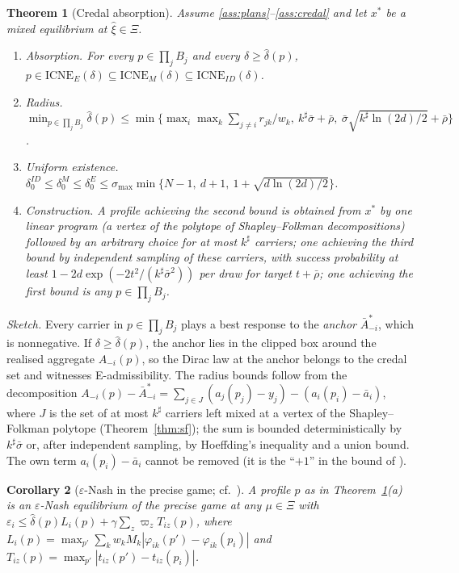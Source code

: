 \documentclass[preprint,12pt]{elsarticle}
\newtheorem{theorem}{Theorem}
\newtheorem{corollary}[theorem]{Corollary}
\theoremstyle{definition}
\theoremstyle{remark}
\newcommand{\abar}{\bar a}
\newcommand{\Abar}{\bar A}
\newcommand{\ICNE}{\mathrm{ICNE}}
\begin{document}
\begin{theorem}[Credal absorption]\label{thm:main}
Assume \ref{ass:plans}--\ref{ass:credal} and let $x^*$ be a mixed equilibrium at $\hat\xi\in\Xi$.
\begin{enumerate}[label=(\alph*),leftmargin=*]
\item \emph{Absorption.} For every $p\in\prod_jB_j$ and every $\delta\ge\hat\delta(p)$, $p\in\ICNE_E(\delta)\subseteq\ICNE_M(\delta)\subseteq\ICNE_{ID}(\delta)$.
\item \emph{Radius.} $\min_{p\in\prod_jB_j}\hat\delta(p)\le\min\big\{\max_i\max_k\sum_{j\ne i}r_{jk}/w_k,\ k^\sharp\bar\sigma+\bar\rho,\ \bar\sigma\sqrt{k^\sharp\ln(2d)/2}+\bar\rho\big\}$.
\item \emph{Uniform existence.} $\delta_0^{ID}\le\delta_0^M\le\delta_0^E\le\sigma_{\max}\min\{N-1,\ d+1,\ 1+\sqrt{d\ln(2d)/2}\}$.
\item \emph{Construction.} A profile achieving the second bound is obtained from $x^*$ by one linear program (a vertex of the polytope of Shapley--Folkman decompositions) followed by an arbitrary choice for at most $k^\sharp$ carriers; one achieving the third bound by independent sampling of these carriers, with success probability at least $1-2d\exp(-2t^2/(k^\sharp\bar\sigma^2))$ per draw for target $t+\bar\rho$; one achieving the first bound is any $p\in\prod_jB_j$.
\end{enumerate}
\end{theorem}

\emph{Sketch.} Every carrier in $p\in\prod_jB_j$ plays a best response to the \emph{anchor} $\Abar^*_{-i}$, which is nonnegative. If $\delta\ge\hat\delta(p)$, the anchor lies in the clipped box around the realised aggregate $A_{-i}(p)$, so the Dirac law at the anchor belongs to the credal set and witnesses E-admissibility. The radius bounds follow from the decomposition $A_{-i}(p)-\Abar^*_{-i}=\sum_{j\in J}(a_j(p_j)-y_j)-(a_i(p_i)-\abar_i)$, where $J$ is the set of at most $k^\sharp$ carriers left mixed at a vertex of the Shapley--Folkman polytope (Theorem~\ref{thm:sf}); the sum is bounded deterministically by $k^\sharp\bar\sigma$ or, after independent sampling, by Hoeffding's inequality \citep{Hoeffding1963} and a union bound. The own term $a_i(p_i)-\abar_i$ cannot be removed (it is the ``$+1$'' in the bound of \citealp{Liu2023}).

\begin{corollary}[$\varepsilon$-Nash in the precise game; cf.\ \citealp{Liu2023}]\label{cor:eps}
A profile $p$ as in Theorem~\ref{thm:main}(a) is an $\varepsilon$-Nash equilibrium of the precise game at any $\mu\in\Xi$ with $\varepsilon_i\le\hat\delta(p)L_i(p)+\gamma\sum_z\varpi_zT_{iz}(p)$, where $L_i(p)=\max_{p'}\sum_kw_kM_k|\varphi_{ik}(p')-\varphi_{ik}(p_i)|$ and $T_{iz}(p)=\max_{p'}|t_{iz}(p')-t_{iz}(p_i)|$.
\end{corollary}
\end{document}
